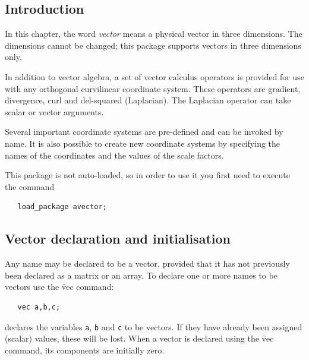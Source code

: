 \setcounter{examplectr}{0}


\subsection{Introduction}

In this chapter, the word \emph{vector} means a physical vector in
three dimensions.  The dimensions cannot be changed; this package
supports vectors in three dimensions only.

In addition to vector algebra, a set of vector calculus operators is
provided for use with any orthogonal curvilinear coordinate system.
These operators are gradient, divergence, curl and del-squared
(Laplacian).  The Laplacian operator can take scalar or vector
arguments.

Several important coordinate systems are pre-defined and can be
invoked by name. It is also possible to create new coordinate systems
by specifying the names of the coordinates and the values of the scale
factors.


This package is not auto-loaded, so in order to use it you first need
to execute the command
\begin{verbatim}
   load_package avector;
\end{verbatim}


\subsection{Vector declaration and initialisation}

Any name may be declared to be a vector, provided that it has not
previously been declared as a matrix or an array.  To declare one or
more names to be vectors use the \f{vec} command:
\hypertarget{command:VEC}{}
\begin{verbatim}
   vec a,b,c;
\end{verbatim}
declares the variables \texttt{a}, \texttt{b} and \texttt{c} to be
vectors.  If they have already been assigned (scalar) values, these
will be lost.  When a vector is declared using the \f{vec} command,
its components are initially zero.

